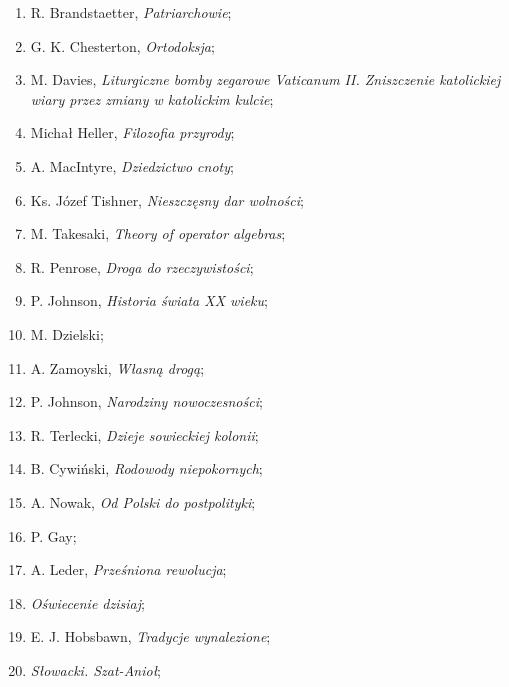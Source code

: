 \documentclass[a4paper,11pt]{article}
\begin{document}
\begin{enumerate}
\item R. Brandstaetter, \textit{Patriarchowie};

\item G. K. Chesterton, \textit{Ortodoksja};

\item M. Davies, \textit{Liturgiczne bomby zegarowe Vaticanum II.
    Zniszczenie katolickiej wiary przez zmiany w katolickim kulcie};

\item Michał Heller, \textit{Filozofia przyrody};

\item A. MacIntyre, \textit{Dziedzictwo cnoty};

\item Ks. Józef Tishner, \textit{Nieszczęsny dar wolności};

\item M. Takesaki, \textit{Theory of operator algebras};

\item R. Penrose, \textit{Droga do rzeczywistości};

\item P. Johnson, \textit{Historia świata XX wieku};

\item M. Dzielski;

\item A. Zamoyski, \textit{Własną drogą};

\item P. Johnson, \textit{Narodziny nowoczesności};

\item R. Terlecki, \textit{Dzieje sowieckiej kolonii};

\item B. Cywiński, \textit{Rodowody niepokornych};

\item A. Nowak, \textit{Od Polski do postpolityki};

\item P. Gay;

\item A. Leder, \textit{Prześniona rewolucja};

\item \textit{Oświecenie dzisiaj};

\item E. J. Hobsbawn, \textit{Tradycje wynalezione};

\item \textit{Słowacki. Szat-Anioł};


\end{enumerate}
\end{document}
